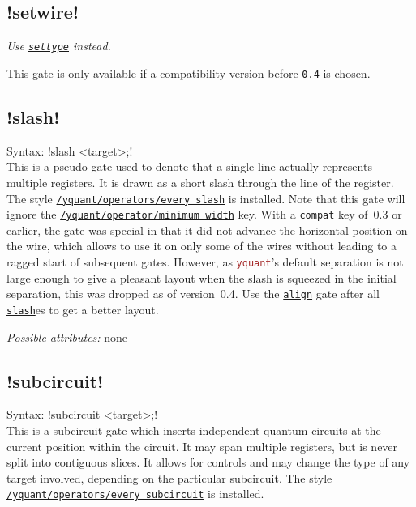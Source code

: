 \documentclass{scrartcl}
\def\pkg#1{\textcolor{brown}{\texttt{#1}}}
\def\gate#1{\hyperref[gate:#1]{\texttt{#1}}}
\def\style#1{\hyperref[style:#1]{\texttt{#1}}}
\def\Yquant{\pkg{yquant}}
\begin{document}
      \subsection[\texorpdfstring{\yquant{setwire}}{setwire}]{\yquant!setwire!}\label{gate:setwire}
         \emph{Use \gate{settype} instead.}

         This gate is only available if a compatibility version before \texttt{0.4} is chosen.

      \subsection[\texorpdfstring{\yquant{slash}}{slash}]{\yquant!slash!}\label{gate:slash}
         Syntax: \yquant!slash <target>;! \\
         This is a pseudo\hyp gate used to denote that a single line actually represents multiple registers.
         It is drawn as a short slash through the line of the register.
         The style \style{/yquant/operators/every slash} is installed.
         Note that this gate will ignore the \style{/yquant/operator/minimum width} key.
         With a \texttt{compat} key of~0.3 or earlier, the gate was special in that it did not advance the horizontal position on the wire, which allows to use it on only some of the wires without leading to a ragged start of subsequent gates.
         However, as \Yquant's default separation is not large enough to give a pleasant layout when the slash is squeezed in the initial separation, this was dropped as of version~0.4.
         Use the \gate{align} gate after all \gate{slash}es to get a better layout.

         \emph{Possible attributes:} none

      \subsection[\texorpdfstring{\yquant{subcircuit}}{subcircuit}]{\yquant!subcircuit!}\label{gate:subcircuit}
         Syntax: \yquant!subcircuit <target>;! \\
         This is a subcircuit gate which inserts independent quantum circuits at the current position within the circuit.
         It may span multiple registers, but is never split into contiguous slices.
         It allows for controls and may change the type of any target involved, depending on the particular subcircuit.
         The style \style{/yquant/operators/every subcircuit} is installed.
\end{document}
